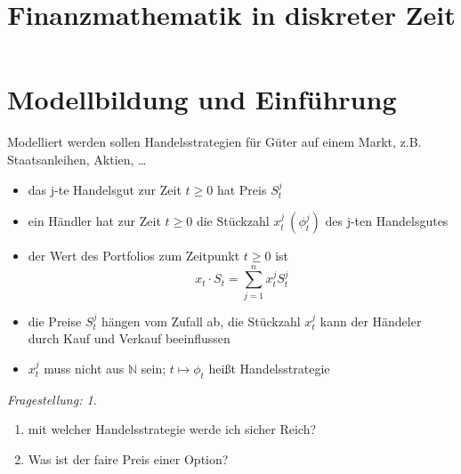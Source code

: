 \documentclass[]{scrartcl}
\title{Finanzmathematik in diskreter Zeit}
\numberwithin{equation}{section}
\theoremstyle{plain}
\theoremstyle{definition}
\theoremstyle{remark}
\theoremstyle{proof}
\newtheorem*{frag}{Fragestellung:}
\newcommand{\N}{\mathbb{N}}
\begin{document}
	\addtocounter{section}{-1}
	\section{Modellbildung und Einführung}
	Modelliert werden sollen Handelsstrategien für Güter  auf einem Markt, z.B. Staatsanleihen, Aktien, \ldots
	\begin{itemize}
		\item das j-te Handelsgut  zur Zeit $t\geq 0$ hat Preis $S_t^j$
		\item ein Händler hat zur Zeit $t\geq 0$ die Stückzahl $x_t^j\ (\phi_t^j)$ des j-ten Handelsgutes
		\item der Wert des Portfolios zum Zeitpunkt $t\geq 0$ ist \[ x_t\cdot S_t=\sum_{j=1}^nx_t^jS_t^j\]
		\item die Preise $S_t^j$ hängen vom Zufall ab, die Stückzahl $x_t^j$ kann der Händeler durch Kauf und Verkauf beeinflussen
		\item $x_t^j$ muss nicht aus $\N$ sein; $t\mapsto\phi_t$ heißt Handelsstrategie
	\end{itemize}
	\begin{frag}\leavevmode
		\begin{enumerate}
			\item mit welcher Handelsstrategie werde ich sicher Reich?
			\item Was ist der faire Preis einer Option?
		\end{enumerate}
	\end{frag}
\end{document}
